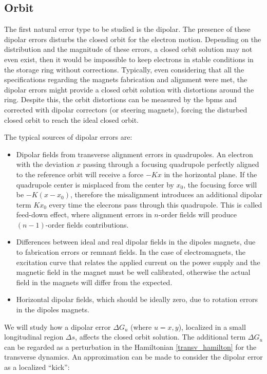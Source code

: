 \subsection{Orbit}\label{subset:orbit}

The first natural error type to be studied is the dipolar. The presence of these dipolar errors disturbs the closed orbit for the electron motion. Depending on the distribution and the magnitude of these errors, a closed orbit solution may not even exist, then it would be impossible to keep electrons in stable conditions in the storage ring without corrections. Typically, even considering that all the specifications regarding the magnets fabrication and alignment were met, the dipolar errors might provide a closed orbit solution with distortions around the ring. Despite this, the orbit distortions can be measured by the \gls{bpm}s and corrected with dipolar correctors (or steering magnets), forcing the disturbed closed orbit to reach the ideal closed orbit.

The typical sources of dipolar errors are:

\begin{itemize}
    \item Dipolar fields from transverse alignment errors in quadrupoles. An electron with the deviation $x$ passing through a focusing quadrupole perfectly aligned to the reference orbit will receive a force $-Kx$ in the horizontal plane. If the quadrupole center is misplaced from the center by $x_0$, the focusing force will be $-K(x - x_0)$, therefore the misalignment introduces an additional dipolar term $K x_0$ every time the elecrons pass through this quadrupole. This is called feed-down effect, where alignment errors in $n$-order fields will produce $(n-1)$-order fields contributions.
    
    \item Differences between ideal and real dipolar fields in the dipoles magnets, due to fabrication errors or remnant fields. In the case of electromagnets, the excitation curve that relates the applied current on the power supply and the magnetic field in the magnet must be well calibrated, otherwise the actual field in the magnets will differ from the expected. 
    
    \item Horizontal dipolar fields, which should be ideally zero, due to rotation errors in the dipoles magnets.
\end{itemize}

We will study how a dipolar error $\Delta G_u$ (where $u=x, y$), localized in a small longitudinal region $\Delta s$, affects the closed orbit solution. The additional term $\Delta G_u$ can be regarded as a perturbation in the Hamiltonian \eqref{transv_hamilton} for the transverse dynamics. An approximation can be made to consider the dipolar error as a localized ``kick'': 

